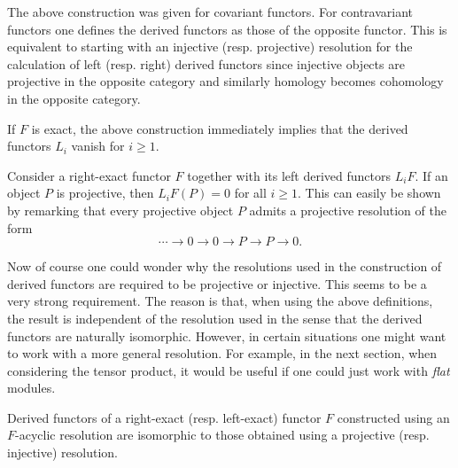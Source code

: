 	\begin{remark}
        The above construction was given for covariant functors. For contravariant functors one defines the derived functors as those of the opposite functor. This is equivalent to starting with an injective (resp. projective) resolution for the calculation of left (resp. right) derived functors since injective objects are projective in the opposite category and similarly homology becomes cohomology in the opposite category.
    \end{remark}

	\begin{property}\label{homalg:exact_vanishing_derived_functor}
		If $F$ is exact, the above construction immediately implies that the derived functors $L_i$ vanish for $i\geq 1$.
	\end{property}

	\begin{property}\label{homalg:projective_object}
		Consider a right-exact functor $F$ together with its left derived functors $L_iF$. If an object $P$ is projective, then $L_iF(P)=0$ for all $i\geq1$. This can easily be shown by remarking that every projective object $P$ admits a projective resolution of the form \[\cdots\longrightarrow0\longrightarrow0\longrightarrow P\longrightarrow P\longrightarrow0.\]
	\end{property}

	Now of course one could wonder why the resolutions used in the construction of derived functors are required to be projective or injective. This seems to be a very strong requirement. The reason is that, when using the above definitions, the result is independent of the resolution used in the sense that the derived functors are naturally isomorphic. However, in certain situations one might want to work with a more general resolution. For example, in the next section, when considering the tensor product, it would be useful if one could just work with \textit{flat} modules.
    \begin{property}\label{homalg:acyclic_derived_functors}
        Derived functors of a right-exact (resp. left-exact) functor $F$ constructed using an $F$-acyclic resolution are isomorphic to those obtained using a projective (resp. injective) resolution.
    \end{property}

